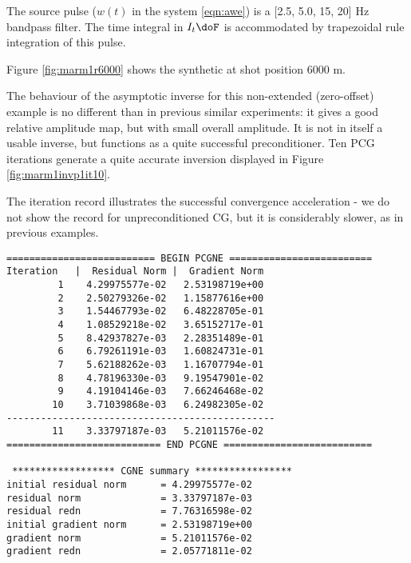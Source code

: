 

The source pulse ($w(t)$ in the
system \ref{eqn:awe}) is a [2.5, 5.0, 15, 20] Hz bandpass filter. The
time integral in $I_t \doF$ is accommodated by trapezoidal rule
integration of this pulse. 

Figure \ref{fig:marm1r6000} shows the synthetic at shot position 6000
m.


The behaviour of the asymptotic inverse for this non-extended
(zero-offset) example is no different than in previous similar
experiments: it gives a good relative amplitude map, but with small
overall amplitude. It is not in itself a usable inverse, but functions
as a quite successful preconditioner. Ten PCG iterations generate a quite accurate
inversion displayed in Figure \ref{fig:marm1invp1it10}. 

The iteration record illustrates the successful convergence
acceleration - we do not show the record for unpreconditioned CG, but
it is considerably slower, as in previous examples.

\begin{verbatim}
========================== BEGIN PCGNE =========================
Iteration   |  Residual Norm |  Gradient Norm
         1    4.29975577e-02   2.53198719e+00
         2    2.50279326e-02   1.15877616e+00
         3    1.54467793e-02   6.48228705e-01
         4    1.08529218e-02   3.65152717e-01
         5    8.42937827e-03   2.28351489e-01
         6    6.79261191e-03   1.60824731e-01
         7    5.62188262e-03   1.16707794e-01
         8    4.78196330e-03   9.19547901e-02
         9    4.19104146e-03   7.66246468e-02
        10    3.71039868e-03   6.24982305e-02
-----------------------------------------------
        11    3.33797187e-03   5.21011576e-02
=========================== END PCGNE ==========================

 ****************** CGNE summary *****************  
initial residual norm      = 4.29975577e-02
residual norm              = 3.33797187e-03
residual redn              = 7.76316598e-02
initial gradient norm      = 2.53198719e+00
gradient norm              = 5.21011576e-02
gradient redn              = 2.05771811e-02

\end{verbatim}

